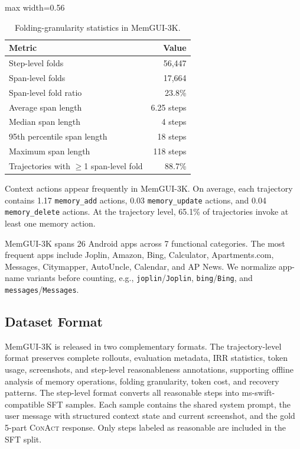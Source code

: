 \documentclass{llmxive}
\providecommand{\memaction}[1]{\texttt{#1}}
\providecommand{\conact}{\textsc{ConAct}\xspace}
\begin{document}
\begin{table}[!htbp]
\centering
\footnotesize
\begin{adjustbox}{max width=0.56\linewidth}
\begin{tabular}{lr}
\toprule
Metric & Value \\
\midrule
Step-level folds & 56{,}447 \\
Span-level folds & 17{,}664 \\
Span-level fold ratio & 23.8\% \\
Average span length & 6.25 steps \\
Median span length & 4 steps \\
95th percentile span length & 18 steps \\
Maximum span length & 118 steps \\
Trajectories with $\geq$1 span-level fold & 88.7\% \\
\bottomrule
\end{tabular}
\end{adjustbox}
\caption{Folding-granularity statistics in MemGUI-3K.}
\label{tab:appendix-folding}
\end{table}

Context actions appear frequently in MemGUI-3K. On average, each trajectory contains 1.17 \memaction{memory\_add} actions, 0.03 \memaction{memory\_update} actions, and 0.04 \memaction{memory\_delete} actions. At the trajectory level, 65.1\% of trajectories invoke at least one memory action.

MemGUI-3K spans 26 Android apps across 7 functional categories. The most frequent apps include Joplin, Amazon, Bing, Calculator, Apartments.com, Messages, Citymapper, AutoUncle, Calendar, and AP News. We normalize app-name variants before counting, e.g., \texttt{joplin}/\texttt{Joplin}, \texttt{bing}/\texttt{Bing}, and \texttt{messages}/\texttt{Messages}.

\subsection{Dataset Format}
\label{sec:appendix-dataset-format}

MemGUI-3K is released in two complementary formats. The trajectory-level format preserves complete rollouts, evaluation metadata, IRR statistics, token usage, screenshots, and step-level reasonableness annotations, supporting offline analysis of memory operations, folding granularity, token cost, and recovery patterns. The step-level format converts all reasonable steps into ms-swift-compatible SFT samples. Each sample contains the shared system prompt, the user message with structured context state and current screenshot, and the gold 5-part \conact response. Only steps labeled as reasonable are included in the SFT split.
\end{document}
